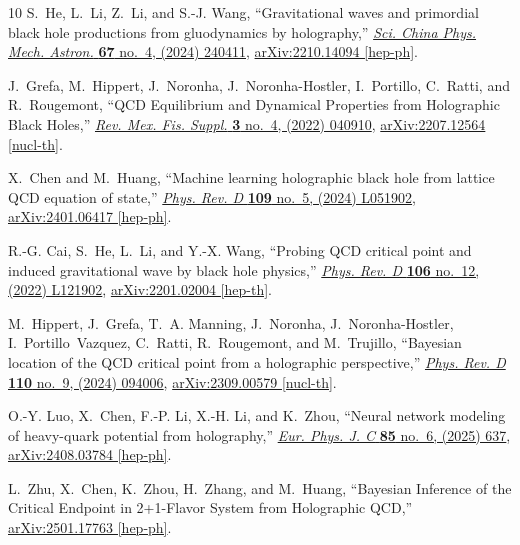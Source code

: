 \documentclass[a4paper,12pt]{article}
\numberwithin{equation}{section}
\begin{document}
\begin{thebibliography}{10}
	S.~He, L.~Li, Z.~Li, and S.-J. Wang, ``{Gravitational waves and primordial
		black hole productions from gluodynamics by holography},''
	\href{http://dx.doi.org/10.1007/s11433-023-2293-2}{{\em Sci. China Phys.
			Mech. Astron.} {\bfseries 67} no.~4, (2024) 240411},
	\href{http://arxiv.org/abs/2210.14094}{{\ttfamily arXiv:2210.14094
			[hep-ph]}}.
	
	J.~Grefa, M.~Hippert, J.~Noronha, J.~Noronha-Hostler, I.~Portillo, C.~Ratti,
	and R.~Rougemont, ``{QCD Equilibrium and Dynamical Properties from
		Holographic Black Holes},''
	\href{http://dx.doi.org/10.31349/SuplRevMexFis.3.040910}{{\em Rev. Mex. Fis.
			Suppl.} {\bfseries 3} no.~4, (2022) 040910},
	\href{http://arxiv.org/abs/2207.12564}{{\ttfamily arXiv:2207.12564
			[nucl-th]}}.
	
	X.~Chen and M.~Huang, ``{Machine learning holographic black hole from lattice
		QCD equation of state},''
	\href{http://dx.doi.org/10.1103/PhysRevD.109.L051902}{{\em Phys. Rev. D}
		{\bfseries 109} no.~5, (2024) L051902},
	\href{http://arxiv.org/abs/2401.06417}{{\ttfamily arXiv:2401.06417
			[hep-ph]}}.
	
	R.-G. Cai, S.~He, L.~Li, and Y.-X. Wang, ``{Probing QCD critical point and
		induced gravitational wave by black hole physics},''
	\href{http://dx.doi.org/10.1103/PhysRevD.106.L121902}{{\em Phys. Rev. D}
		{\bfseries 106} no.~12, (2022) L121902},
	\href{http://arxiv.org/abs/2201.02004}{{\ttfamily arXiv:2201.02004
			[hep-th]}}.
	
	M.~Hippert, J.~Grefa, T.~A. Manning, J.~Noronha, J.~Noronha-Hostler,
	I.~Portillo~Vazquez, C.~Ratti, R.~Rougemont, and M.~Trujillo, ``{Bayesian
		location of the QCD critical point from a holographic perspective},''
	\href{http://dx.doi.org/10.1103/PhysRevD.110.094006}{{\em Phys. Rev. D}
		{\bfseries 110} no.~9, (2024) 094006},
	\href{http://arxiv.org/abs/2309.00579}{{\ttfamily arXiv:2309.00579
			[nucl-th]}}.
	
	O.-Y. Luo, X.~Chen, F.-P. Li, X.-H. Li, and K.~Zhou, ``{Neural network modeling
		of heavy-quark potential from holography},''
	\href{http://dx.doi.org/10.1140/epjc/s10052-025-14319-2}{{\em Eur. Phys. J.
			C} {\bfseries 85} no.~6, (2025) 637},
	\href{http://arxiv.org/abs/2408.03784}{{\ttfamily arXiv:2408.03784
			[hep-ph]}}.
	
	L.~Zhu, X.~Chen, K.~Zhou, H.~Zhang, and M.~Huang, ``{Bayesian Inference of the
		Critical Endpoint in 2+1-Flavor System from Holographic QCD},''
	\href{http://arxiv.org/abs/2501.17763}{{\ttfamily arXiv:2501.17763
			[hep-ph]}}.
	

\end{thebibliography}
\end{document}
